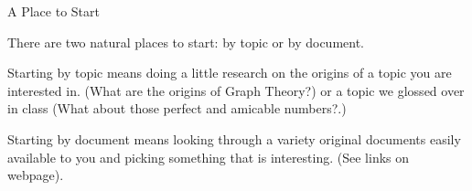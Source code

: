 \documentclass[12pt]{article}
\begin{document}
{\large{A Place to Start}}

There are two natural places to start: by topic or by document.

Starting by topic means doing a little research on the origins of a topic you are interested in. (What are the origins of Graph Theory?) or a topic we glossed over in class (What about those perfect and amicable numbers?.)

Starting by document means looking through a variety original documents easily available to you and picking something that is interesting. (See links on webpage).
\end{document}
